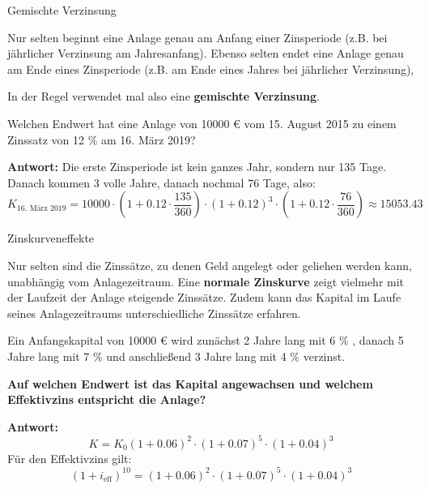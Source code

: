 \begin{frame}{Gemischte Verzinsung}
	\begin{bemerkung}
		Nur selten beginnt eine Anlage genau am Anfang einer Zinsperiode (z.B. bei jährlicher Verzinsung am Jahresanfang). Ebenso selten endet eine Anlage genau am Ende eines Zinsperiode (z.B. am Ende eines Jahres bei jährlicher Verzinsung),
		
		In der Regel verwendet mal also eine \textbf{gemischte Verzinsung}.
	\end{bemerkung}
	\small{\begin{example}
		Welchen Endwert hat eine Anlage von 10000 € vom 15. August 2015 zu einem Zinssatz von 12 \% am 16. März 2019?
		
		\textbf{Antwort:} Die erste Zinsperiode ist kein ganzes Jahr, sondern nur 135 Tage. Danach kommen 3 volle Jahre, danach nochmal 76 Tage, also:
		\[
		K_{\text{16. März 2019}} = 10000 \cdot \left( 1+0.12\cdot\frac{135}{360}  \right) \cdot \left( 1+0.12 \right)^{3} \cdot \left( 1+0.12\cdot\frac{76}{360} \right) \approx 15053.43
		\]
	\end{example}}
\end{frame}

\begin{frame}{Zinskurveneffekte}
\small{	\begin{bemerkung}
		Nur selten sind die Zinssätze, zu denen Geld angelegt oder geliehen werden kann, unabhängig vom Anlagezeitraum. 
		Eine \textbf{normale Zinskurve} zeigt vielmehr mit der Laufzeit der Anlage steigende Zinssätze.
		Zudem kann das Kapital im Laufe seines Anlagezeitraums unterschiedliche Zinssätze erfahren.
	\end{bemerkung}
	\begin{example}
		Ein Anfangskapital von 10000 € wird zunächst 2 Jahre lang mit 6 \% , danach 5 Jahre lang mit 7 \% und anschließend 3 Jahre lang mit 4 \% verzinst. 
		
		\textbf{Auf welchen Endwert ist das Kapital angewachsen und welchem Effektivzins entspricht die Anlage?}
		
		\textbf{Antwort:} 
		\[
		K = K_{0} \left( 1+0.06 \right)^{2} \cdot \left( 1+0.07 \right)^{5} \cdot \left( 1+0.04 \right)^{3} 
		\]
		Für den Effektivzins gilt:
		\[
		\left(1+i_{\text{eff}}\right)^{10} = \left( 1+0.06 \right)^{2} \cdot \left( 1+0.07 \right)^{5} \cdot \left( 1+0.04 \right)^{3}
 		\]
		
	\end{example}}
\end{frame}

